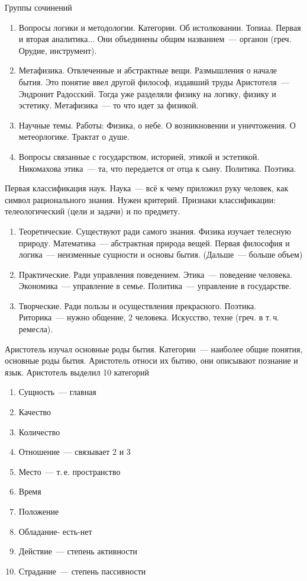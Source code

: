 
Группы сочинений

\begin{enumerate}
	\item Вопросы логики и методологии. Категории. Об истолковании. Топиаа. Первая и вторая аналитика... Они объединены общим названием~--- органон (греч. Орудие, инструмент). 
	\item Метафизика. Отвлеченные и абстрактные вещи. Размышления о начале бытия. Это понятие ввел другой философ, издавший труды Аристотеля~--- Эндронит Радосский. Тогда уже разделяли физику на логику, физику и эстетику. Метафизика~--- то что идет за физикой. 
	\item Научные темы. Работы: Физика, о небе. О возникновении и уничтожения. О метеорлогике. Трактат о душе. 
	\item Вопросы связанные с государством, историей, этикой и эстетикой. Никомахова этика~--- та, что передается от отца к сыну. Политика. Поэтика. 
\end{enumerate}

Первая классификация наук. Наука~--- всё к чему приложил руку человек, как символ рационального знания. Нужен критерий. Признаки классификации: телеологический (цели и задачи) и по предмету. 

	
\begin{enumerate}
	\item Теоретические. Существуют ради самого знания. Физика изучает телесную природу. Математика~--- абстрактная природа вещей. Первая философия и логика~--- неизменные сущности и основы бытия. (Дальше~--- больше объем) 
	\item Практические. Ради управления поведением. Этика~--- поведение человека. Экономика~--- управление в семье. Политика~--- управление в государстве. 
	\item Творческие. Ради пользы и осуществления прекрасного. Поэтика. Риторика~--- нужно общение, 2 человека. Искусство, техне (греч. в т.\,ч. ремесла). 
\end{enumerate}

Аристотель изучал основные роды бытия. Категории~--- наиболее общие понятия, основные роды бытия. Аристотель относи их бытию, они описывают познание и язык. 
Аристотель выделил 10 категорий

\begin{enumerate}
	\item Сущность~--- главная
	\item Качество
	\item Количество
	\item Отношение~--- связывает 2 и 3
	\item Место~--- т.\,е. пространство
	\item Время
	\item Положение
	\item Обладание- есть-нет
	\item Действие~--- степень активности
	\item Страдание~--- степень пассивности
\end{enumerate}

